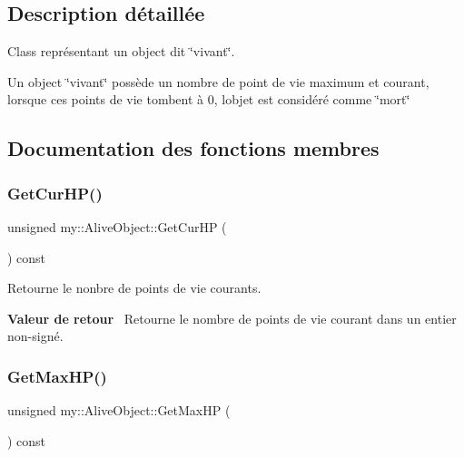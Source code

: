 \subsection{Description détaillée}
Class représentant un object dit \char`\"{}vivant\char`\"{}. 

Un object \char`\"{}vivant\char`\"{} possède un nombre de point de vie maximum et courant, lorsque ces points de vie tombent à 0, l\textquotesingle{}objet est considéré comme \char`\"{}mort\char`\"{} 

\subsection{Documentation des fonctions membres}
\mbox{\label{classmy_1_1AliveObject_ad5c35dbc2ccd74c9edd73fb19b89e6bb}} 
\subsubsection{\texorpdfstring{Get\+Cur\+H\+P()}{GetCurHP()}}
{\footnotesize\ttfamily unsigned my\+::\+Alive\+Object\+::\+Get\+Cur\+HP (\begin{DoxyParamCaption}{ }\end{DoxyParamCaption}) const\hspace{0.3cm}{\ttfamily [noexcept]}}



Retourne le nonbre de points de vie courants. 

{\bfseries Valeur de retour}~\newline
 Retourne le nombre de points de vie courant dans un entier non-\/signé. \mbox{\label{classmy_1_1AliveObject_a4537ba5f7d099b5ae2bd59b6db93a76b}} 
\subsubsection{\texorpdfstring{Get\+Max\+H\+P()}{GetMaxHP()}}
{\footnotesize\ttfamily unsigned my\+::\+Alive\+Object\+::\+Get\+Max\+HP (\begin{DoxyParamCaption}{ }\end{DoxyParamCaption}) const\hspace{0.3cm}{\ttfamily [noexcept]}}



